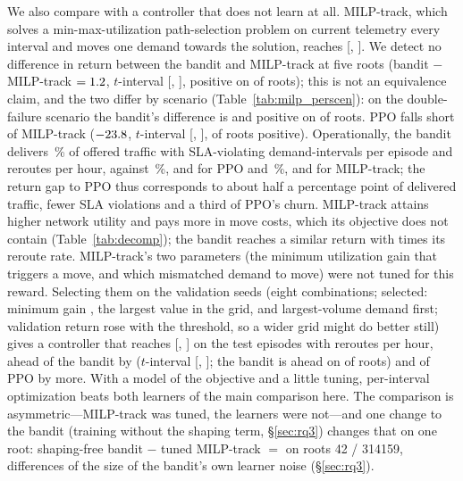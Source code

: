 We also compare with a controller that does not learn at all. MILP-track, which solves a min-max-utilization path-selection problem on
current telemetry every interval and moves one demand towards the solution,
reaches \TestMilp{} [\TestMilpLo, \TestMilpHi]. We detect no difference in return
between the bandit and MILP-track at five roots (bandit $-$ MILP-track
$=1.2{}$, $t$-interval [\BanditMinusMilpTLo,
\BanditMinusMilpTHi], positive on \BanditMinusMilpRootsPositive{} of
\GapRoots{} roots); this is not an equivalence claim, and the two differ by
scenario (Table~\ref{tab:milp_perscen}): on the double-failure
scenario the bandit's difference is \BanditMilpDoublefailure{} and positive on
\BanditMilpDoublefailureRootsPositive{} of \GapRoots{} roots. PPO falls
short of MILP-track ($-23.8$, $t$-interval [\PPOMinusMilpTLo,
\PPOMinusMilpTHi], \PPOMinusMilpRootsPositive{} of \GapRoots{} roots
positive). Operationally, the
bandit delivers \TestBanditDelivered\,\% of offered traffic with
\TestBanditSla{} SLA-violating demand-intervals per episode and
\TestBanditReroutes{} reroutes per hour, against \TestPPODelivered\,\%,
\TestPPOSla{} and \TestPPOReroutes{} for PPO and \TestMilpDelivered\,\%,
\TestMilpSla{} and \TestMilpReroutes{} for MILP-track; the return gap to PPO
thus corresponds to about half a percentage point of delivered traffic, fewer
SLA violations and a third of PPO's churn. MILP-track attains higher network utility and pays more in
move costs, which its objective does not contain (Table~\ref{tab:decomp}); the
bandit reaches a similar return with \ChurnRatioBanditMilp{} times its reroute
rate. MILP-track's two parameters (the minimum utilization gain that triggers a
move, and which mismatched demand to move) were not tuned for this reward.
Selecting them on the validation seeds (eight combinations; selected:
minimum gain \MilpTunedGain{}, the largest value in the grid, and
largest-volume demand first; validation return rose with the threshold, so a
wider grid might do better still) gives a controller that reaches
\TestMilpTuned{} [\TestMilpTunedLo, \TestMilpTunedHi] on the test episodes
with \TestMilpTunedReroutes{} reroutes per hour, ahead of the bandit by
\MilpTunedAhead{} ($t$-interval [\MilpTunedAheadTLo, \MilpTunedAheadTHi];
the bandit is ahead on \BanditMinusMilpTunedRootsPositive{} of \GapRoots{}
roots) and of PPO by more. With a model of the objective and a little tuning,
per-interval optimization beats both learners of the main comparison here.
The comparison is asymmetric---MILP-track was tuned, the learners were
not---and one change to the bandit (training without the shaping term,
\S\ref{sec:rq3}) changes that on one root: shaping-free bandit $-$ tuned MILP-track
$=$ \NoShapingMinusMilpTunedPerRoot{} on roots 42 / 314159, differences of the
size of the bandit's own learner noise (\S\ref{sec:rq3}).

